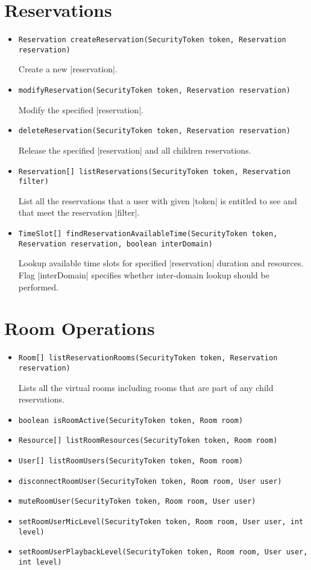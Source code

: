 \documentclass[a4paper]{report}
\newcommand{\APIcode}[1]{\lstinline[style=myinline]!#1!}
\newcommand{\APIcmd}[1]{%
\item \APIcode{#1}%

}
\newenvironment{APIdef}{\begin{itemize}}{\end{itemize}}
\begin{document}
\section{Reservations}

\begin{APIdef}

\APIcmd{Reservation createReservation(SecurityToken token, Reservation reservation)}
Create a new |reservation|.

\APIcmd{modifyReservation(SecurityToken token, Reservation reservation)}
Modify the specified |reservation|.

\APIcmd{deleteReservation(SecurityToken token, Reservation reservation)}
Release the specified |reservation| and all children reservations.

\APIcmd{Reservation[] listReservations(SecurityToken token, Reservation filter)}
List all the reservations that a user with given |token| is entitled to see and that meet the reservation |filter|.

\APIcmd{TimeSlot[] findReservationAvailableTime(SecurityToken token, Reservation reservation, boolean interDomain)}
Lookup available time slots for specified |reservation| duration and resources. Flag |interDomain| specifies whether inter-domain lookup should be performed.


\end{APIdef}


\section{Room Operations}

\begin{APIdef}

\APIcmd{Room[] listReservationRooms(SecurityToken token, Reservation reservation)}

Lists all the virtual rooms including rooms that are part of any child reservations.

\APIcmd{boolean isRoomActive(SecurityToken token, Room room)}

\APIcmd{Resource[] listRoomResources(SecurityToken token, Room room)}

\APIcmd{User[] listRoomUsers(SecurityToken token, Room room)}

\APIcmd{disconnectRoomUser(SecurityToken token, Room room, User user)}

\APIcmd{muteRoomUser(SecurityToken token, Room room, User user)}

\APIcmd{setRoomUserMicLevel(SecurityToken token, Room room, User user, int level)}

\APIcmd{setRoomUserPlaybackLevel(SecurityToken token, Room room, User user, int level)}

\end{APIdef}
\end{document}
